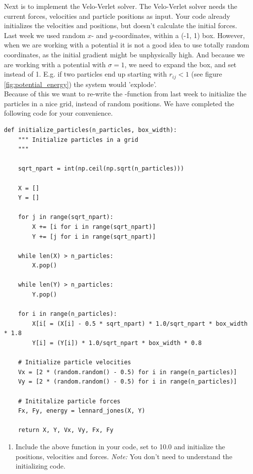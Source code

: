 \documentclass{article}
\begin{document}
Next is to implement the Velo-Verlet solver.
The Velo-Verlet solver needs the current forces, velocities and particle positions as input.
Your code already initializes the velocities and positions, but doesn't calculate the initial forces.\\

Last week we used random $x$- and $y$-coordinates, within a (-1, 1) box.
However, when we are working with a potential it is not a good idea to use totally random coordinates, as the initial gradient might be unphysically high.
And because we are working with a potential with $\sigma = 1$, we need to expand the box, and set  instead of 1.
E.g. if two particles end up starting with $r_{ij} < 1$ (see figure \ref{fig:potential_energy}) the system would 'explode'.\\

Because of this we want to re-write the -function from last week to initialize the particles in a nice grid, instead of random positions.
We have completed the following code for your convenience.

\begin{lstlisting}
def initialize_particles(n_particles, box_width):
    """ Initialize particles in a grid
    """

    sqrt_npart = int(np.ceil(np.sqrt(n_particles)))

    X = []
    Y = []

    for j in range(sqrt_npart):
        X += [i for i in range(sqrt_npart)]
        Y += [j for i in range(sqrt_npart)]

    while len(X) > n_particles:
        X.pop()

    while len(Y) > n_particles:
        Y.pop()

    for i in range(n_particles):
        X[i[ = (X[i] - 0.5 * sqrt_npart) * 1.0/sqrt_npart * box_width * 1.8
        Y[i] = (Y[i]) * 1.0/sqrt_npart * box_width * 0.8

    # Initialize particle velocities
    Vx = [2 * (random.random() - 0.5) for i in range(n_particles)]
    Vy = [2 * (random.random() - 0.5) for i in range(n_particles)]

    # Inititalize particle forces
    Fx, Fy, energy = lennard_jones(X, Y)

    return X, Y, Vx, Vy, Fx, Fy

\end{lstlisting}

\begin{enumerate}[resume]
    \item Include the above  function in your code, set  to 10.0 and initialize the positions, velocities and forces.
    {\em Note:} You don't need to understand the initializing code.
\end{enumerate}
\end{document}
